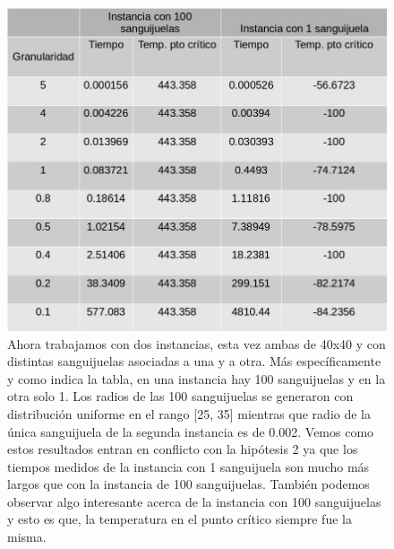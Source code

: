 \begin{figure}[H]
\centering
\includegraphics[scale=0.4]{instancias40x40.jpg}\caption{Ahora trabajamos con dos instancias, esta vez ambas de 40x40 y con distintas sanguijuelas asociadas a una y a otra. Más específicamente y como indica la tabla, en una instancia hay 100 sanguijuelas y en la otra solo 1. Los radios de las 100 sanguijuelas se generaron con distribución uniforme en el rango [25, 35] mientras que radio de la única sanguijuela de la segunda instancia es de 0.002.  Vemos como estos resultados entran en conflicto con la hipótesis 2 ya que los tiempos medidos de la instancia con 1 sanguijuela son mucho más largos que con la instancia de 100 sanguijuelas. También podemos observar algo interesante acerca de la instancia con 100 sanguijuelas y esto es que, la temperatura en el punto crítico siempre fue la misma. }
\end{figure}

